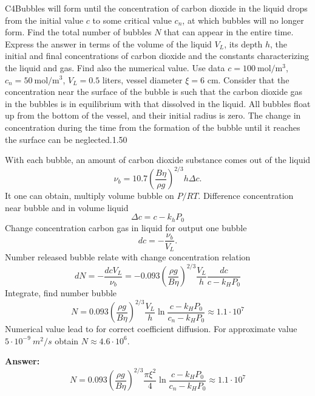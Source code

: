 \documentclass[11pt,a4paper]{article}
\begin{document}
\begin{solcard}{C4}{Bubbles will form until the concentration of carbon dioxide in the liquid drops from the initial value $c$ to some critical value $c_n$, at which bubbles will no longer form. Find the total number of bubbles $N$ that can appear in the entire time. Express the answer in terms of the volume of the liquid $V_L$, its depth $h$, the initial and final concentrations of carbon dioxide and the constants characterizing the liquid and gas. Find also the numerical value. Use data $c=100~\text{mol}/\text{m}^3$, $c_n = 50~\text{mol}/\text{m}^3 $, $V_L = 0.5$ liters, vessel diameter $\xi = 6$ cm. Consider that the concentration near the surface of the bubble is such that the carbon dioxide gas in the bubbles is in equilibrium with that dissolved in the liquid. All bubbles float up from the bottom of the vessel, and their initial radius is zero. The change in concentration during the time from the formation of the bubble until it reaches the surface can be neglected.}{1.50}

With each bubble, an amount of carbon dioxide substance comes out of the liquid $$ \nu_b = 10.7 \left( \frac{B \eta}{\rho g}\right)^{2/3} h \Delta c. $$ It one can obtain, multiply volume bubble on $P/RT$. Difference concentration near bubble and in volume liquid $$ \Delta c = c - k_hP_0 $$ Change concentration carbon gas in liquid for output one  bubble $$ dc =- \frac{\nu _b}{V_L}. $$ Number released bubble relate with change concentration relation $$ dN = -\frac{dc V_L}{\nu_b} =- 0.093\left( \frac{\rho g }{B \eta} \right)^{2/3} \frac{V_L}{h}\frac{dc}{c - k_H P_0} $$ Integrate, find number bubble $$ N = 0.093\left( \frac{\rho g }{B \eta} \right)^{2/3} \frac{V_L}{h} \ln \frac{c - k_H P_0}{c_n - k_H P_0} \approx 1.1 \cdot 10^7 $$ Numerical value lead to for correct coefficient diffusion. For approximate value $5 \cdot 10^{-9} ~m^2/s$ obtain $N \approx 4.6 \cdot 10^6$.

\par\smallskip\noindent\textbf{Answer:} $$ N = 0.093\left( \frac{\rho g }{B \eta} \right)^{2/3} \frac{\pi \xi^2}{4} \ln \frac{c - k_H P_0}{c_n - k_H P_0} \approx 1.1 \cdot 10^7 $$
\end{solcard}
\end{document}
